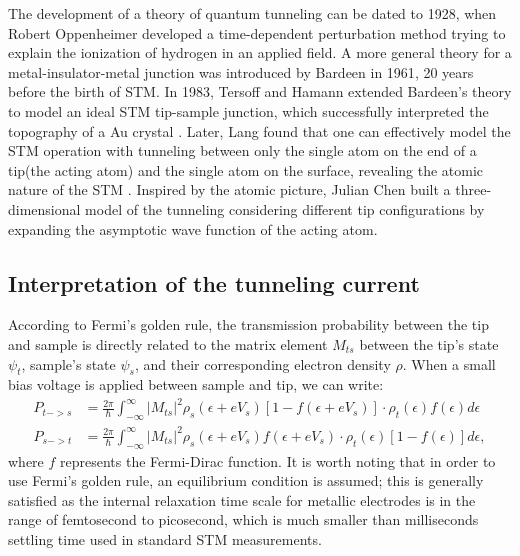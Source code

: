 The development of a theory of quantum tunneling can be dated to 1928, when Robert Oppenheimer developed a time-dependent perturbation method trying to explain the ionization of hydrogen in an applied field\cite{oppenheimerThreeNotesQuantum1928}. A more general theory for a metal-insulator-metal junction was introduced by Bardeen in 1961\cite{bardeenTunnellingManyParticlePoint1961}, 20 years before the birth of \ac{STM}. In 1983, Tersoff and Hamann extended Bardeen's theory to model an ideal STM tip-sample junction, which successfully interpreted the topography of a Au crystal \cite{tersoffTheoryApplicationScanning1983}\cite{tersoffTheoryScanningTunneling1985}. Later, Lang found that one can effectively model the \ac{STM} operation with tunneling between only the single atom on the end of a tip(the acting atom) and the single atom on the surface, revealing the atomic nature of the \ac{STM} \cite{langVacuumTunnelingCurrent1985}\cite{langSpectroscopySingleAtoms1986}\cite{langApparentSizeAtom1987}. Inspired by the atomic picture, Julian Chen built a three-dimensional model of the tunneling considering different tip configurations by expanding the asymptotic wave function of the acting atom\cite{chenTunnelingMatrixElements1990}\cite{chenTheoryScanningTunneling1988}.  

\subsection{Interpretation of the tunneling current}
According to Fermi's golden rule, the transmission probability between the tip and sample is directly related to the matrix element $M_{ts}$ between the tip's state $\psi_{t}$, sample's state $\psi_{s}$, and their corresponding electron density $\rho$. When a small bias voltage is applied between sample and tip, we can write:
\begin{align}
	P_{t->s} &= \frac{2\pi}{\hslash}\int_{-\infty}^{\infty}|M_{ts}|^2\rho_s(\epsilon + eV_s)[1-f(\epsilon+eV_s)]\cdot \rho_t(\epsilon)f(\epsilon) d\epsilon \\
	P_{s->t} &= \frac{2\pi}{\hslash}\int_{-\infty}^{\infty}|M_{ts}|^2\rho_s(\epsilon + eV_s)f(\epsilon+eV_s)\cdot \rho_t(\epsilon)[1-f(\epsilon)] d\epsilon,
\end{align} 
where $f$ represents the Fermi-Dirac function. It is worth noting that in order to use Fermi's golden rule, an equilibrium condition is assumed; this is generally satisfied as the internal relaxation time scale for metallic electrodes is in the range of femtosecond to picosecond, which is much smaller than milliseconds settling time used in standard \ac{STM} measurements. 


